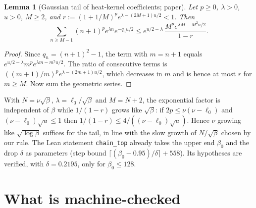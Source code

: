 \documentclass[11pt,a4paper]{article}
\newtheorem{lemma}[theorem]{Lemma}
\theoremstyle{definition}
\theoremstyle{remark}
\newcommand{\code}[1]{\texttt{#1}}
\begin{document}
\begin{lemma}[Gaussian tail of heat-kernel coefficients; paper]\label{lem:tail}
Let $p\ge0$, $\lambda>0$, $u>0$, $M\ge2$, and $r:=(1+1/M)^pe^{\lambda-(2M+1)u/2}<1$. Then
\[
\sum_{n\ge M-1}(n+1)^pe^{\lambda n}e^{-q_nu/2}\le e^{u/2-\lambda}\,\frac{M^pe^{\lambda M-M^2u/2}}{1-r}.
\]
\end{lemma}
\begin{proof}
Since $q_n=(n+1)^2-1$, the term with $m=n+1$ equals $e^{u/2-\lambda}m^pe^{\lambda m-m^2u/2}$.
The ratio of consecutive terms is $((m+1)/m)^pe^{\lambda-(2m+1)u/2}$, which decreases in $m$ and is hence at most $r$ for $m\ge M$.
Now sum the geometric series.
\end{proof}
With $N=\nu\sqrt\beta$, $\lambda=\ell_0/\sqrt\beta$ and $M=N+2$, the exponential factor is independent of $\beta$ while $1/(1-r)$ grows like $\sqrt\beta$: if $2p\le\nu(\nu-\ell_0)$ and $(\nu-\ell_0)\sqrt u\le1$ then $1/(1-r)\le4/((\nu-\ell_0)\sqrt u)$.
Hence $\nu$ growing like $\sqrt{\log\beta}$ suffices for the tail, in line with the slow growth of $N/\sqrt\beta$ chosen by our rule.
The Lean statement \code{chain\_top} already takes the upper end $\beta_0$ and the drop $\delta$ as parameters (step bound $\lceil(\beta_0-0.95)/\delta\rceil+558$).
Its hypotheses are verified, with $\delta=0.2195$, only for $\beta_0\le128$.

\section{What is machine-checked}\label{sec:lean}
\end{document}
